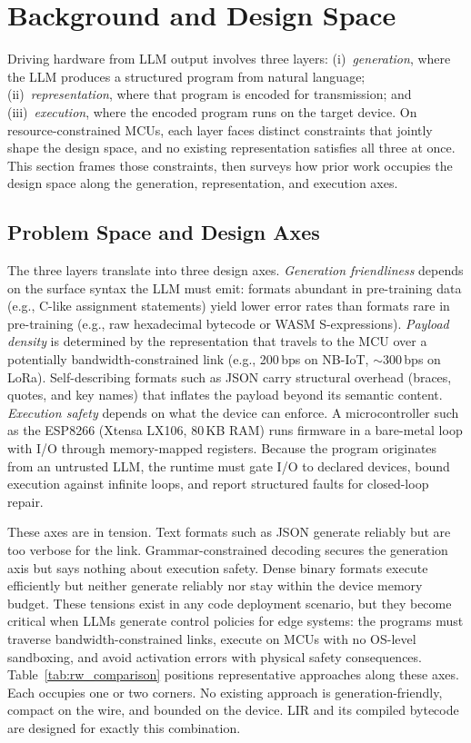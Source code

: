 \documentclass[a4paper,fleqn,longmktitle]{cas-dc}
\begin{document}
\section{Background and Design Space}
\label{sec:background}

Driving hardware from LLM output involves three layers: (i)~\emph{generation}, where the LLM produces a structured program from natural language; (ii)~\emph{representation}, where that program is encoded for transmission; and (iii)~\emph{execution}, where the encoded program runs on the target device. On resource-constrained MCUs, each layer faces distinct constraints that jointly shape the design space, and no existing representation satisfies all three at once. This section frames those constraints, then surveys how prior work occupies the design space along the generation, representation, and execution axes.

\subsection{Problem Space and Design Axes}
\label{sec:bg_problem}

The three layers translate into three design axes. \emph{Generation friendliness} depends on the surface syntax the LLM must emit: formats abundant in pre-training data (e.g., C-like assignment statements) yield lower error rates than formats rare in pre-training (e.g., raw hexadecimal bytecode or WASM S-expressions). \emph{Payload density} is determined by the representation that travels to the MCU over a potentially bandwidth-constrained link (e.g., 200\,bps on NB-IoT, $\sim$300\,bps on LoRa). Self-describing formats such as JSON carry structural overhead (braces, quotes, and key names) that inflates the payload beyond its semantic content. \emph{Execution safety} depends on what the device can enforce. A microcontroller such as the ESP8266 (Xtensa LX106, 80\,KB RAM) runs firmware in a bare-metal loop with I/O through memory-mapped registers. Because the program originates from an untrusted LLM, the runtime must gate I/O to declared devices, bound execution against infinite loops, and report structured faults for closed-loop repair.

These axes are in tension. Text formats such as JSON generate reliably but are too verbose for the link. Grammar-constrained decoding secures the generation axis but says nothing about execution safety. Dense binary formats execute efficiently but neither generate reliably nor stay within the device memory budget. These tensions exist in any code deployment scenario, but they become critical when LLMs generate control policies for edge systems: the programs must traverse bandwidth-constrained links, execute on MCUs with no OS-level sandboxing, and avoid activation errors with physical safety consequences. Table~\ref{tab:rw_comparison} positions representative approaches along these axes. Each occupies one or two corners. No existing approach is generation-friendly, compact on the wire, and bounded on the device. LIR and its compiled bytecode are designed for exactly this combination.
\end{document}

